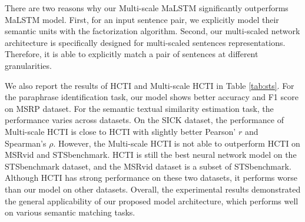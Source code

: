 There are two reasons why our Multi-scale MaLSTM significantly outperforms MaLSTM model. First, for an input sentence pair, 
we explicitly model their semantic units with the factorization algorithm.
Second, our multi-scaled network architecture is 
specifically designed
for multi-scaled sentences representations. Therefore, it is able to explicitly match a pair of sentences at different granularities.

We also report the results of HCTI and Multi-scale HCTI in Table \ref{tab:sts}. For the paraphrase identification task, our model shows better accuracy and F1 score on MSRP dataset. For the semantic textual similarity estimation task, the performance varies across datasets. On the SICK dataset, the performance of Multi-scale HCTI is close to HCTI with slightly better Pearson' $r$ and Spearman's $\rho$. However, the Multi-scale HCTI is not able to outperform HCTI on MSRvid and STSbenchmark. HCTI is still the best neural network model on the STSbenchmark dataset, and the MSRvid dataset is a subset of STSbenchmark.
Although HCTI has strong performance on these two datasets, it performs worse than our model on other datasets.
Overall, the experimental results demonstrated the general applicability of our proposed model architecture, which performs well on various semantic matching tasks.



